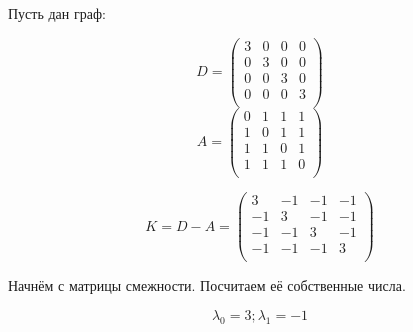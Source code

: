 \begin{example}
Пусть дан граф:
  \begin{center}
  \end{center}
  $$ D =
  \left({
  \begin{array}{rrrrrr}
  3 & 0 & 0 & 0 \\
  0 & 3 & 0 & 0 \\
  0 & 0 & 3 & 0 \\
  0 & 0 & 0 & 3 \\
  \end{array}
  }\right)
$$
$$ A =
  \left({
  \begin{array}{rrrrrr}
  0 & 1 & 1 & 1 \\
  1 & 0 & 1 & 1 \\
  1 & 1 & 0 & 1 \\
  1 & 1 & 1 & 0 \\
  \end{array}
  }\right)
$$

$$ K = D - A =
  \left({
  \begin{array}{rrrrrr}
  3  & -1 & -1 & -1  \\
  -1 &  3 & -1 & -1  \\
  -1 & -1 &  3 & -1  \\
  -1 & -1 & -1 &  3  \\
  \end{array}
  }\right)
$$

Начнём с матрицы смежности. Посчитаем её собственные числа.

$$\lambda_0 = 3; \lambda_1 = -1 $$

\end{example}



